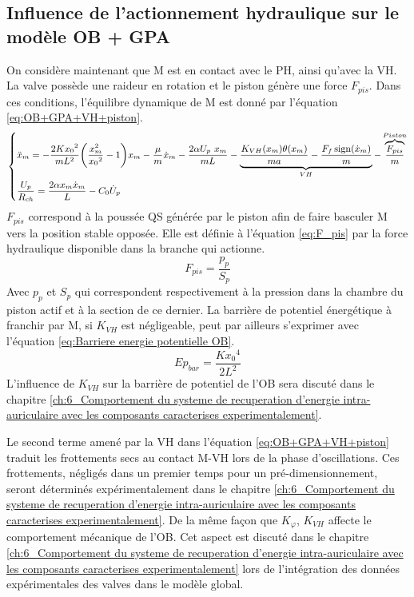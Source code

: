 	\subsection{Influence de l'actionnement hydraulique sur le modèle OB + GPA}
	\label{2.3.2_Influence du circuit hydraulique sur le modele OB-GPA}
On considère maintenant que M est en contact avec le PH, ainsi qu'avec la VH. La valve possède une raideur en rotation et le piston génère une force $F_{pis}$. Dans ces conditions, l'équilibre dynamique de M est donné par l'équation \ref{eq:OB+GPA+VH+piston}.
\begin{equation}
\begin{small}
\begin{dcases}
\ddot{x}_m = - \frac{2K{x_0}^2}{mL^2}\biggl(\frac{x_m^2}{{x_0}^2} -1\biggr)x_m - \frac{\mu}{m}\dot{x}_m - \frac{2\alpha U_p\ x_m}{mL} - \underbrace{\frac{K_{VH}(x_m)\theta(x_m)}{ma} - \frac{F_f\sign(\dot{x}_m)}{m}}_{VH} - \overbrace{\frac{F_{pis}}{m} }^{Piston}\\
\dfrac{U_p}{R_{ch}} = \frac{2\alpha x_m \dot{x}_m}{L} - C_0\dot{U}_p
\end{dcases}
\label{eq:OB+GPA+VH+piston}	
\end{small}
\end{equation}
$F_{pis}$ correspond à la poussée QS générée par le piston afin de faire basculer M vers la position stable opposée. Elle est définie à l'équation \ref{eq:F_pis} par la force hydraulique disponible dans la branche qui actionne. 
\begin{equation}
	F_{pis} = \dfrac{p_p}{S_p}
	\label{eq:F_pis}
\end{equation}
Avec $p_p$ et $S_p$ qui correspondent respectivement à la pression dans la chambre du piston actif et à la section de ce dernier. La barrière de potentiel énergétique à franchir par M, si $K_{VH}$ est négligeable, peut par ailleurs s'exprimer avec l'équation \ref{eq:Barriere energie potentielle OB}. 
\begin{equation}
	Ep_{bar} = \dfrac{K{x_0}^4}{2L^2}
	\label{eq:Barriere energie potentielle OB}
\end{equation}
L'influence de $K_{VH}$ sur la barrière de potentiel de l'OB sera discuté dans le chapitre \ref{ch:6_Comportement du systeme de recuperation d’energie intra-auriculaire avec les composants caracterises experimentalement}.

Le second terme amené par la VH dans l'équation \ref{eq:OB+GPA+VH+piston} traduit les frottements secs au contact M-VH lors de la phase d'oscillations. Ces frottements, négligés dans un premier temps pour un pré-dimensionnement, seront déterminés expérimentalement dans le chapitre \ref{ch:6_Comportement du systeme de recuperation d’energie intra-auriculaire avec les composants caracterises experimentalement}. De la même façon que $K_{\varphi}$, $K_{VH}$ affecte le comportement mécanique de l'OB. Cet aspect est discuté dans le chapitre \ref{ch:6_Comportement du systeme de recuperation d’energie intra-auriculaire avec les composants caracterises experimentalement} lors de l'intégration des données expérimentales des valves dans le modèle global.

